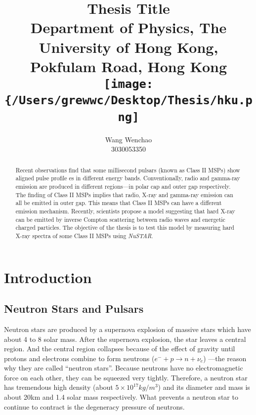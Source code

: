 \documentclass[12pt]{report}
\title{\textbf{Thesis Title}\\ \vspace{1cm}
			{\large Department of Physics, The University of Hong Kong, Pokfulam Road, Hong Kong}\\ \vspace{1cm}
			{\texttt{[image: \{/Users/grewwc/Desktop/Thesis/hku.png]}}}\\ \vspace{3cm}
}
\date{}
\author{Wang Wenchao  \\3030053350}
\begin{document}
\maketitle
\tableofcontents{}
\begin{abstract}
    \normalsize
    Recent observations find that some millisecond pulsars (known as Class II MSPs) show aligned pulse profile
    es in 
    different energy bands. Conventionally, radio and gamma-ray emission are produced in different 
    regions---in polar cap 
    and outer gap respectively. The finding of Class II MSPs implies that radio, X-ray and gamma-ray 
    emission 
    can all be emitted in outer gap. This means that Class II MSPs can have a different emission mechanism. 
    Recently, 
    scientists propose a model suggesting that hard X-ray can be emitted by inverse Compton scattering 
    between radio
    waves and energetic charged particles. The objective of the thesis is to test this model by measuring 
    hard X-ray 
    spectra of some Class II MSPs using \textit{NuSTAR}. 
\end{abstract}
			
		

\chapter{Introduction}   	   
    \section{Neutron Stars and Pulsars}
        Neutron stars are produced by a supernova explosion of massive stars which have about 4 to 8 
        solar mass. After 
        the supernova explosion, the star leaves a central region. And the central region collapses because 
        of the effect of 
        gravity until protons and electrons combine to form neutrons ($e^{-}+p\rightarrow n+\nu_{e}$)
        ---the reason why they are called 
        ``neutron stars''.  
        Because neutrons have no electromagnetic force on each other, they can be squeezed very tightly. 
        Therefore, a neutron  
        star has tremendous high density (about $5\times 10^{17} kg/m^3$) and its diameter and mass is about
        20km and 
        1.4 solar mass respectively. What
        prevents a neutron star to continue to contract is the degeneracy pressure of neutrons. 
        
\end{document}
